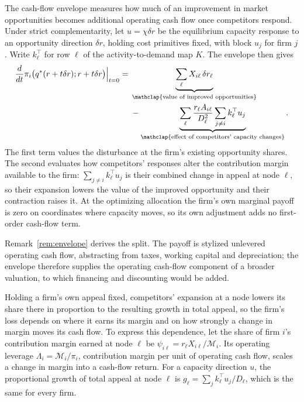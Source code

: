 The cash-flow envelope measures how much of an improvement in market
opportunities becomes additional operating cash flow once competitors respond.
Under strict complementarity, let $u=\chi\delta r$ be the equilibrium
capacity response to an opportunity direction $\delta r$, holding cost
primitives fixed, with block $u_j$ for firm $j$.
Write $k_\ell^\top$ for row $\ell$ of the activity-to-demand map $K$.
The envelope then gives
\begin{equation}\label{eq:equilibrium-cash-flow}
  \begin{split}
    \frac{d}{dt}\pi_i\bigl(q^*(r+t\delta r);r+t\delta r\bigr)\Big|_{t=0}
    ={}&\underbrace{\sum_\ell X_{i\ell}\,\delta r_\ell}
    _{\mathclap{\text{value of improved opportunities}}}\\
    &-\underbrace{\sum_\ell\frac{r_\ell A_{i\ell}}{D_\ell^2}
    \sum_{j\ne i}k_\ell^\top u_j}
    _{\mathclap{\text{effect of competitors' capacity changes}}}.
  \end{split}
\end{equation}
The first term values the disturbance at the firm's existing opportunity
shares.
The second evaluates how competitors' responses alter the contribution margin
available to the firm: $\sum_{j\ne i}k_\ell^\top u_j$ is their combined change
in appeal at node $\ell$, so their expansion lowers the value of the improved
opportunity and their contraction raises it.
At the optimizing allocation the firm's own marginal payoff is zero on
coordinates where capacity moves, so its own adjustment adds no first-order
cash-flow term.

Remark~\ref{rem:envelope} derives the split.
The payoff is stylized unlevered operating cash flow, abstracting from taxes,
working capital and depreciation; the envelope therefore supplies the operating
cash-flow component of a broader valuation, to which financing and discounting
would be added.

Holding a firm's own appeal fixed, competitors' expansion at a node lowers its
share there in proportion to the resulting growth in total appeal, so the
firm's loss depends on where it earns its margin and on how strongly a change
in margin moves its cash flow.
To express this dependence, let the share of firm $i$'s contribution margin
earned at node $\ell$ be
$\psi_{i\ell}=r_\ell X_{i\ell}/\mathcal M_i$.
Its operating leverage $\Lambda_i=\mathcal M_i/\pi_i$, contribution margin per
unit of operating cash flow, scales a change in margin into a cash-flow return.
For a capacity direction $u$, the proportional growth of total appeal at node
$\ell$ is $g_\ell=\sum_j k_\ell^\top u_j/D_\ell$, which is the same
for every firm.

